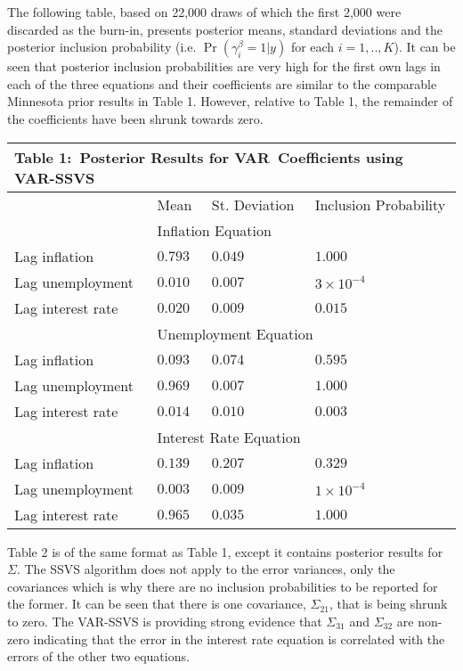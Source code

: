 \documentclass{article}
\begin{document}
The following table, based on 22,000 draws of which the first 2,000 were
discarded as the burn-in, presents posterior means, standard deviations and
the posterior inclusion probability (i.e. $\Pr \left( \gamma _{i}^{\beta
}=1|y\right) $ for each $i=1,..,K$). It can be seen that posterior inclusion
probabilities are very high for the first own lags in each of the three
equations and their coefficients are similar to the comparable Minnesota
prior results in Table 1. However, relative to Table 1, the remainder of the
coefficients have been shrunk towards zero.

\begin{center}
\begin{tabular}{|l|l|l|l|}
\hline
\multicolumn{4}{|l|}{Table 1:\ Posterior Results for VAR\ Coefficients using
VAR-SSVS} \\ \hline
& Mean & St. Deviation & Inclusion Probability \\ \hline
& \multicolumn{3}{|l|}{Inflation Equation} \\ \hline
Lag inflation & $0.793$ & $0.049$ & $1.000$ \\ \hline
Lag unemployment & $0.010$ & $0.007$ & $3\times 10^{-4}$ \\ \hline
Lag interest rate & $0.020$ & $0.009$ & $0.015$ \\ \hline
& \multicolumn{3}{|l|}{Unemployment Equation} \\ \hline
Lag inflation & $0.093$ & $0.074$ & $0.595$ \\ \hline
Lag unemployment & $0.969$ & $0.007$ & $1.000$ \\ \hline
Lag interest rate & $0.014$ & $0.010$ & $0.003$ \\ \hline
& \multicolumn{3}{|l|}{Interest Rate Equation} \\ \hline
Lag inflation & $0.139$ & $0.207$ & $0.329$ \\ \hline
Lag unemployment & $0.003$ & $0.009$ & $1\times 10^{-4}$ \\ \hline
Lag interest rate & $0.965$ & $0.035$ & $1.000$ \\ \hline
\end{tabular}
\end{center}

Table 2 is of the same format as Table 1, except it contains posterior
results for $\Sigma .$ The SSVS algorithm does not apply to the error
variances, only the covariances which is why there are no inclusion
probabilities to be reported for the former. It can be seen that there is
one covariance, $\Sigma _{21}$, that is being shrunk to zero. The VAR-SSVS
is providing strong evidence that $\Sigma _{31}$ and $\Sigma _{32}$ are
non-zero indicating that the error in the interest rate equation is
correlated with the errors of the other two equations.
\end{document}
